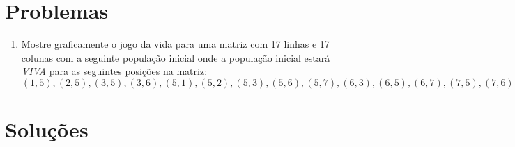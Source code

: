 %
%







\section*{Problemas}
\begin{enumerate}
\item
  Mostre graficamente o jogo da vida para uma matriz com 17 linhas e 17 colunas com a seguinte população inicial onde a população inicial estará \emph{VIVA} para as seguintes posições na matriz:
  $$
    (1,5), (2,5), (3,5), (3,6), (5,1), (5,2), (5,3), (5,6), (5,7), (6,3), (6,5), (6,7), (7,5), (7,6)
  $$
  \label{ex:cap02_ex2}
\end{enumerate}

\section*{Soluções}

